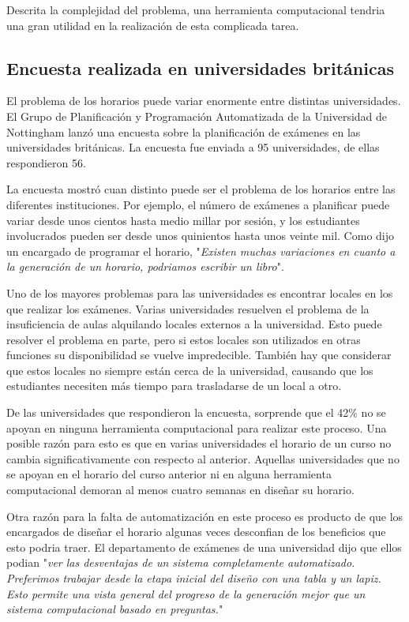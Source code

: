 Descrita la complejidad del problema, una herramienta computacional tendria una gran utilidad en la realización
de esta complicada tarea.

\subsection{Encuesta realizada en universidades británicas}

El problema de los horarios puede variar enormente entre distintas universidades. El Grupo de Planificación
y Programación Automatizada de la Universidad de Nottingham lanzó una encuesta \cite{survey of University of Nottingham} sobre la planificación de exámenes en las universidades británicas. La encuesta fue enviada a
95 universidades, de ellas respondieron 56.

La encuesta mostró cuan distinto puede ser el problema de los horarios entre las diferentes instituciones.
Por ejemplo, el número de exámenes a planificar puede variar desde unos cientos hasta medio millar por sesión,
y los estudiantes involucrados pueden ser desde unos quinientos hasta unos veinte mil. Como dijo un
encargado de programar el horario, "\emph{Existen muchas variaciones en cuanto a la generación de un horario,
podriamos escribir un libro}".

Uno de los mayores problemas para las universidades es encontrar locales en los que realizar los exámenes.
Varias universidades resuelven el problema de la insuficiencia de aulas alquilando locales externos a la
universidad. Esto puede resolver el problema en parte, pero si estos locales son utilizados en otras funciones
su disponibilidad se vuelve impredecible. También hay que considerar que estos locales no siempre están cerca de
la universidad, causando que los estudiantes necesiten más tiempo para trasladarse de un local a otro.

De las universidades que respondieron la encuesta, sorprende que el 42\% no se apoyan en ninguna herramienta
computacional para realizar este proceso. Una posible razón para esto es que en varias universidades el
horario de un curso no cambia significativamente con respecto al anterior. Aquellas universidades que no
se apoyan en el horario del curso anterior ni en alguna herramienta computacional demoran al menos cuatro
semanas en diseñar su horario.

Otra razón para la falta de automatización en este proceso es producto de que los encargados de diseñar el horario
algunas veces desconfian de los beneficios que esto podria traer. El departamento de exámenes de una universidad
dijo que ellos podian "\emph{ver las desventajas de un sistema completamente automatizado. Preferimos trabajar
desde la etapa inicial del diseño con una tabla y un lapiz. Esto permite una vista general del progreso de la
generación mejor que un sistema computacional basado en preguntas.}"

